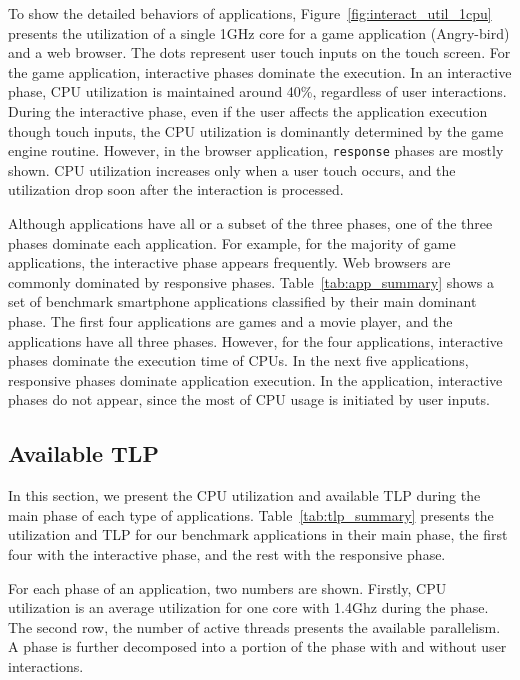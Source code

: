 To show the detailed behaviors of applications, Figure~\ref{fig:interact_util_1cpu} presents
the utilization of a single 1GHz core for a game application (Angry-bird) and a web browser.
The dots represent user touch inputs on the touch screen.
For the game application, interactive phases dominate the execution.
In an interactive phase,
CPU utilization is maintained around 40\%, regardless of user interactions.
During the interactive phase, even if the user affects the application execution though
touch inputs, the CPU utilization is dominantly determined by the game engine routine.
However, in the browser application, {\tt response} phases are mostly
shown. CPU utilization increases only when a user touch occurs, and the utilization
drop soon after the interaction is processed.



Although applications have all or a subset of the three phases, one of the three phases
dominate each application. For example, for the majority of game applications, 
the interactive phase appears frequently. Web browsers are commonly dominated by
responsive phases. Table~\ref{tab:app_summary} shows a set of benchmark smartphone 
applications classified by their main dominant phase.
The first four applications are games and a movie player, and the applications
have all three phases. However, for the four applications, interactive phases
dominate the execution time of CPUs.
In the next five applications, responsive phases dominate application execution. In the application,
interactive phases do not appear, since the most of CPU usage is initiated by user inputs.



\subsection {Available TLP}

In this section, we present the CPU utilization and available TLP during the main phase
of each type of applications. 
Table~\ref{tab:tlp_summary} presents the utilization and TLP for our benchmark applications in
their main phase, the first four with the interactive phase, and the rest with
the responsive phase.

For each phase of an application, two numbers are shown. Firstly,
CPU utilization is an average utilization for one core with 1.4Ghz during the phase. 
The second row, the number of
active threads presents the available parallelism. 
A phase is further decomposed into a portion of the phase with and without
user interactions. 

